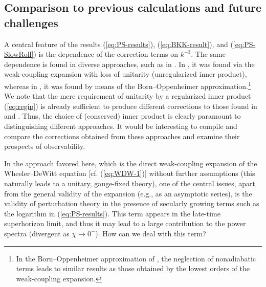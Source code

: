 \documentclass[12pt]{iopart}
\def\eref#1{(\ref{eq:#1})}
\begin{document}
\subsection{\label{sec:challenges}Comparison to previous calculations and future challenges}
A central feature of the results \eref{PS-results}, \eref{BKK-result}, and \eref{PS-SlowRoll} is the dependence of the correction terms on $k^{-3}$. The same dependence is found in diverse approaches, such as in \citet{KTV1,KTV2,KTV3}. In \citet{Brizuela:2015tzl,Brizuela:2016gnz,Brizuela:2019jzv}, it was found via the weak-coupling expansion with loss of unitarity (unregularized inner product), whereas in \citet{KTV1,KTV2,KTV3}, it was found by means of the Born--Oppenheimer approximation.\footnote{In the Born--Oppenheimer approximation of \citet{KTV1,KTV2,KTV3}, the neglection of nonadiabatic terms leads to similar results as those obtained by the lowest orders of the weak-coupling expansion.} We note that the mere requirement of unitarity by a regularized inner product \eref{regip} is already sufficient to produce different corrections to those found in \citet{Brizuela:2015tzl,Brizuela:2016gnz,Brizuela:2019jzv} and \citet{KTV1,KTV2,KTV3}. Thus, the choice of (conserved) inner product is clearly paramount to distinguishing different approaches. It would be interesting to compile and compare the corrections obtained from these approaches and examine their prospects of observability.

In the approach favored here, which is the direct weak-coupling expansion of the Wheeler--DeWitt equation [cf. \eref{WDW-1}] without further assumptions (this naturally leads to a unitary, gauge-fixed theory), one of the central issues, apart from the general validity of the expansion (e.g., as an asymptotic series), is the validity of perturbation theory in the presence of secularly growing terms such as the logarithm in \eref{PS-results}. This term appears in the late-time superhorizon limit, and thus it may lead to a large contribution to the power spectra (divergent as $\chi\to0^-$). How can we deal with this term?
\end{document}
